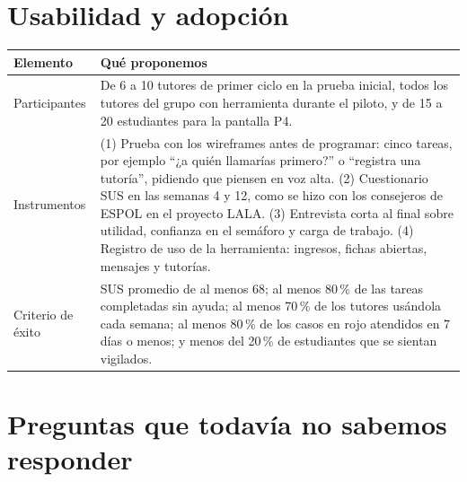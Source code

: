 \documentclass[11pt]{article}
\begin{document}
\section{Usabilidad y adopción}

{\small
\begin{longtable}{P{3.4cm} P{12.0cm}}
\toprule
\textbf{Elemento} & \textbf{Qué proponemos}\\
\midrule
\endhead
\bottomrule
\endfoot
Participantes & De 6 a 10 tutores de primer ciclo en la prueba inicial, todos los tutores del grupo con herramienta durante el piloto, y de 15 a 20 estudiantes para la pantalla P4.\\
Instrumentos & (1) Prueba con los wireframes antes de programar: cinco tareas, por ejemplo ``¿a quién llamarías primero?'' o ``registra una tutoría'', pidiendo que piensen en voz alta. (2) Cuestionario SUS en las semanas 4 y 12, como se hizo con los consejeros de ESPOL en el proyecto LALA. (3) Entrevista corta al final sobre utilidad, confianza en el semáforo y carga de trabajo. (4) Registro de uso de la herramienta: ingresos, fichas abiertas, mensajes y tutorías.\\
Criterio de éxito & SUS promedio de al menos 68; al menos 80\,\% de las tareas completadas sin ayuda; al menos 70\,\% de los tutores usándola cada semana; al menos 80\,\% de los casos en rojo atendidos en 7 días o menos; y menos del 20\,\% de estudiantes que se sientan vigilados.\\
\end{longtable}
}

\section{Preguntas que todavía no sabemos responder}
\end{document}

